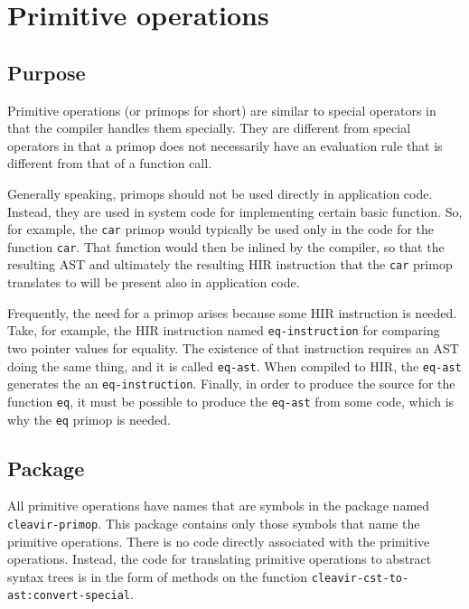 \chapter{Primitive operations}

\section{Purpose}

Primitive operations (or primops for short) are similar to
\commonlisp{} special operators in that the compiler handles them
specially.  They are different from \commonlisp{} special operators in
that a primop does not necessarily have an evaluation rule that is
different from that of a function call.

Generally speaking, primops should not be used directly in application
code.  Instead, they are used in system code for implementing certain
basic \commonlisp{} function.  So, for example, the \texttt{car}
primop would typically be used only in the code for the \commonlisp{}
function \texttt{car}.  That function would then be inlined by the
compiler, so that the resulting AST and ultimately the resulting HIR
instruction that the \texttt{car} primop translates to will be present
also in application code.

Frequently, the need for a primop arises because some HIR instruction
is needed.  Take, for example, the HIR instruction named
\texttt{eq-instruction} for comparing two pointer values for equality.
The existence of that instruction requires an AST doing the same
thing, and it is called \texttt{eq-ast}.  When compiled to HIR, the
\texttt{eq-ast} generates the an \texttt{eq-instruction}.  Finally, in
order to produce the source for the \commonlisp{} function
\texttt{eq}, it must be possible to produce the \texttt{eq-ast} from
some \commonlisp{} code, which is why the \texttt{eq} primop is
needed.

\section{Package}

All primitive operations have names that are symbols in the package
named \texttt{cleavir-primop}.  This package contains only those
symbols that name the primitive operations.  There is no code directly
associated with the primitive operations.  Instead, the code for
translating primitive operations to abstract syntax trees
 is in the form of methods on the
function \texttt{cleavir-cst-to-ast:convert-special}.

